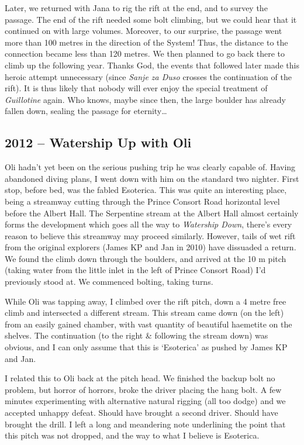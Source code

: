 Later, we returned with Jana to rig the rift at the end, and to survey
the passage. The end of the rift needed some bolt climbing, but we could
hear that it continued on with large volumes. Moreover, to our surprise,
the passage went more than 100 metres in the direction of the System!
Thus, the distance to the connection became less than 120 metres. We
then planned to go back there to climb up the following year. Thanks
God, the events that followed later made this heroic attempt unnecessary
(since \emph{Sanje za Duso} 
crosses the continuation of the rift). It is thus likely that nobody
will ever enjoy the special treatment of \emph{Guillotine} again. Who
knows, maybe since then, the large boulder has already fallen down,
sealing the passage for eternity\ldots{}



\subsection{2012 -- Watership Up with Oli}

Oli hadn't yet been on the serious pushing trip he was clearly capable
of. Having abandoned diving plans, I went down with him on the standard
two nighter. First stop, before bed, was the fabled Esoterica. This was
quite an interesting place, being a streamway cutting through the Prince
Consort Road horizontal level before the Albert Hall. The Serpentine
stream at the Albert Hall almost certainly forms the development which
goes all the way to \emph{Watership Down}, there's every reason to
believe this streamway may proceed similarly. However, tails of wet rift
from the original explorers (James KP and Jan in 2010) have dissuaded a
return. We found the climb down through the boulders, and arrived at the
10 m pitch (taking water from the little inlet in the left of Prince
Consort Road) I'd previously stood at. We commenced bolting, taking
turns.

While Oli was tapping away, I climbed over the rift pitch, down a 4
metre free climb and intersected a different stream. This stream came
down (on the left) from an easily gained chamber, with vast quantity of
beautiful haemetite on the shelves. The continuation (to the right \&
following the stream down) was obvious, and I can only assume that this
is `Esoterica' as pushed by James KP and Jan.

I related this to Oli back at the pitch head. We finished the backup
bolt no problem, but horror of horrors, broke the driver placing the
hang bolt. A few minutes experimenting with alternative natural rigging
(all too dodge) and we accepted unhappy defeat. Should have brought a
second driver. Should have brought the drill. I left a long and
meandering note underlining the point that this pitch was not dropped,
and the way to what I believe is Esoterica.

